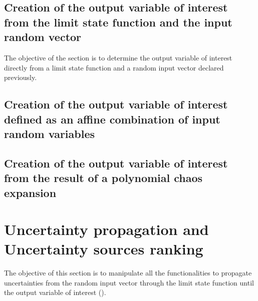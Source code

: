 
\newpage 
\newpage 
\newpage 
\newpage 
\newpage 

\newpage \subsection{Creation of the output variable of interest from the limit state function and the input random  vector}


The objective of the section is to determine the output variable of interest directly from a limit state function and a random input vector declared previously.



\newpage 


\newpage \subsection{Creation of the output variable of interest defined as an affine combination of input random variables}






\newpage \subsection{Creation of the output variable of interest from the result of a polynomial chaos expansion}


\newpage 

\newpage \section{Uncertainty propagation and Uncertainty sources ranking}

The objective of this section is to manipulate all the functionalities to propagate uncertainties from the random input vector through the limit state function until the output variable of interest
().

